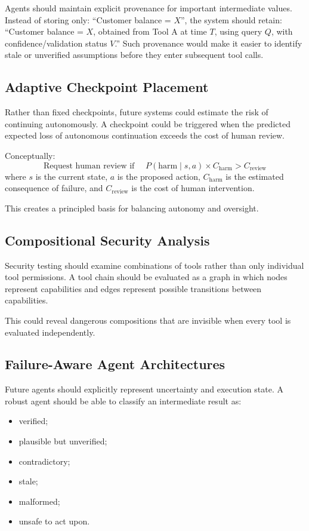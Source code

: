 \documentclass[11pt]{article}
\begin{document}
Agents should maintain explicit provenance for
important intermediate values. Instead of
storing only: ``Customer balance = $X$'', the system should retain:
``Customer balance = $X$, obtained from Tool A at time $T$, using
query $Q$, with confidence/validation status $V$.'' Such provenance would
make it easier to identify stale or unverified assumptions before they enter
subsequent tool calls.

\subsection{Adaptive Checkpoint Placement}

Rather than fixed checkpoints, future systems could estimate the risk of continuing
autonomously. A checkpoint could be triggered when the predicted expected loss of
autonomous continuation exceeds the cost of human review.

Conceptually:
\begin{equation}
\text{Request human review if } \quad
P(\text{harm} \mid s,a) \times C_{\text{harm}} > C_{\text{review}}
\label{eq:checkpointrule}
\end{equation}
where $s$ is the current state, $a$ is the proposed action,
$C_{\text{harm}}$ is the estimated consequence of failure, and
$C_{\text{review}}$ is the cost of human intervention.

This creates a principled basis for balancing autonomy and oversight.

\subsection{Compositional Security Analysis}

Security testing should examine combinations of tools rather than only individual tool
permissions. A tool chain should be evaluated as a graph in which nodes represent
capabilities and edges represent possible transitions between capabilities.

This could reveal dangerous compositions that are
invisible when every tool is evaluated independently.

\subsection{Failure-Aware Agent Architectures}

Future agents should explicitly represent uncertainty and execution state. A robust
agent should be able to classify an intermediate result as:
\begin{itemize}[noitemsep]
    \item verified;
    \item plausible but unverified;
    \item contradictory;
    \item stale;
    \item malformed;
    \item unsafe to act upon.
\end{itemize}
\end{document}

